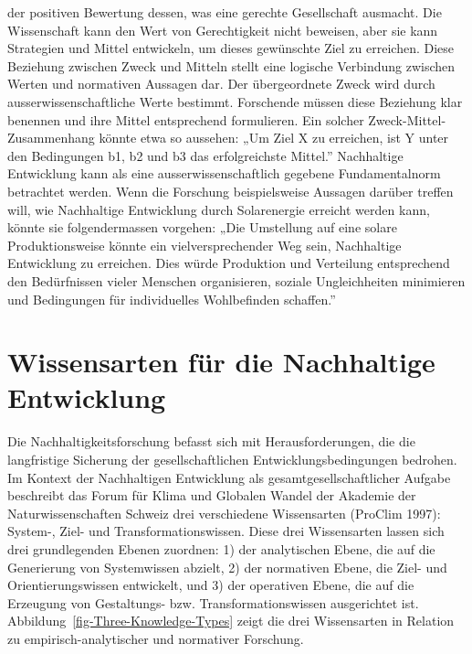 \documentclass[
  nswissgerman,
  a4paper,
  DIV=11,
  numbers=noendperiod,
  oneside,
  openany]{scrreprt}
\begin{document}
\begin{itemize}
  der positiven Bewertung dessen, was eine gerechte Gesellschaft
  ausmacht. Die Wissenschaft kann den Wert von Gerechtigkeit nicht
  beweisen, aber sie kann Strategien und Mittel entwickeln, um dieses
  gewünschte Ziel zu erreichen. Diese Beziehung zwischen Zweck und
  Mitteln stellt eine logische Verbindung zwischen Werten und normativen
  Aussagen dar. Der übergeordnete Zweck wird durch
  ausserwissenschaftliche Werte bestimmt. Forschende müssen diese
  Beziehung klar benennen und ihre Mittel entsprechend formulieren. Ein
  solcher Zweck-Mittel-Zusammenhang könnte etwa so aussehen: „Um Ziel X
  zu erreichen, ist Y unter den Bedingungen b1, b2 und b3 das
  erfolgreichste Mittel.'' Nachhaltige Entwicklung kann als eine
  ausserwissenschaftlich gegebene Fundamentalnorm betrachtet werden.
  Wenn die Forschung beispielsweise Aussagen darüber treffen will, wie
  Nachhaltige Entwicklung durch Solarenergie erreicht werden kann,
  könnte sie folgendermassen vorgehen: „Die Umstellung auf eine solare
  Produktionsweise könnte ein vielversprechender Weg sein, Nachhaltige
  Entwicklung zu erreichen. Dies würde Produktion und Verteilung
  entsprechend den Bedürfnissen vieler Menschen organisieren, soziale
  Ungleichheiten minimieren und Bedingungen für individuelles
  Wohlbefinden schaffen.''
\end{itemize}

\section{Wissensarten für die Nachhaltige
Entwicklung}\label{wissensarten-fuxfcr-die-nachhaltige-entwicklung}

Die Nachhaltigkeitsforschung befasst sich mit Herausforderungen, die die
langfristige Sicherung der gesellschaftlichen Entwicklungsbedingungen
bedrohen. Im Kontext der Nachhaltigen Entwicklung als
gesamtgesellschaftlicher Aufgabe beschreibt das Forum für Klima und
Globalen Wandel der Akademie der Naturwissenschaften Schweiz drei
verschiedene Wissensarten (ProClim 1997): System-, Ziel- und
Transformationswissen. Diese drei Wissensarten lassen sich drei
grundlegenden Ebenen zuordnen: 1) der analytischen Ebene, die auf die
Generierung von Systemwissen abzielt, 2) der normativen Ebene, die Ziel-
und Orientierungswissen entwickelt, und 3) der operativen Ebene, die auf
die Erzeugung von Gestaltungs- bzw. Transformationswissen ausgerichtet
ist. Abbildung~\ref{fig-Three-Knowledge-Types} zeigt die drei
Wissensarten in Relation zu empirisch-analytischer und normativer
Forschung.
\end{document}
